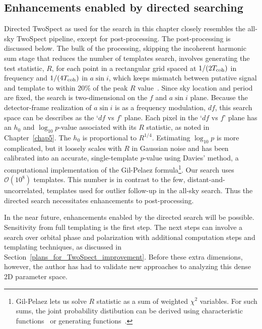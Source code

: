 
            \subsection{Enhancements enabled by directed searching}
            \label{directed_enhancements}

Directed TwoSpect as used for the search in this chapter closely resembles the all-sky TwoSpect pipeline, except for post-processing. 
The post-processing is discussed below.
The bulk of the processing, skipping the incoherent harmonic sum stage that reduces the number of templates search, involves generating the test statistic, $R$, for each point in a rectangular grid spaced at $1/(2T_\textup{coh})$ in frequency and $1/(4T_\textup{coh})$ in $a \sin i$, which keeps mismatch between putative signal and template to within 20\% of the peak $R$ value~\cite{GoetzTwoSpectMethods2011}.
Since sky location and period are fixed, the search is two-dimensional on the $f$ and $a \sin i$ plane. 
Because the detector-frame realization of $a \sin i$ is as a frequency modulation, $df$, this search space can be describes as the `$df$ vs $f$' plane.
Each pixel in the `$df$ vs $f$' plane has an $h_0$ and $\log_{10} p$-value associated with its $R$ statistic, as noted in Chapter~\ref{chap5}.
The $h_0$ is proportional to $R^{1/4}$.
Estimating $\log_{10} p$ is more complicated, but it loosely scales with $R$ in Gaussian noise and has been calibrated into an accurate, single-template $p$-value using Davies' method, a computational implementation of the Gil-Pelaez formula\footnote{Gil-Pelaez lets us solve $R$ statistic as a sum of weighted $\chi^2$ variables. For such sums, the joint probability distibution can be derived using characteristic functions~\cite{GoetzThesis} or generating functions~\cite{RomeroThesis}.}.
Our search uses $\mathcal{O}(10^8)$ templates. 
This number is in contrast to the few, distant-and-uncorrelated, templates used for outlier follow-up in the all-sky search.
Thus the directed search necessitates enhancements to post-processing.

In the near future, enhancements enabled by the directed search will be possible.
Sensitivity from full templating is the first step.
The next steps can involve a search over orbital phase and polarization with additional computation steps and templating techniques, as discussed in Section~\ref{plans_for_TwoSpect_improvement}.
Before these extra dimensions, however, the author has had to validate new approaches to analyzing this dense 2D parameter space.


